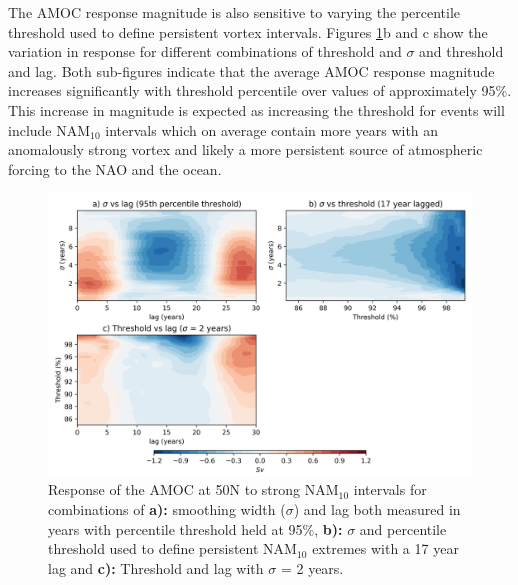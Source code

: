 The AMOC response magnitude is also sensitive to varying the percentile threshold used to define persistent vortex intervals. Figures \ref{sensitivity}b and c show the variation in response for different combinations of threshold and $\sigma$ and threshold and lag. Both sub-figures indicate that the average AMOC response magnitude increases significantly with threshold percentile over values of approximately 95\%. This increase in magnitude is expected as increasing the threshold for events will include NAM$_{10}$ intervals which on average contain more years with an anomalously strong vortex and likely a more persistent source of atmospheric forcing to the NAO and the ocean. 

\begin{figure}[h!]
\begin{center}
\noindent\includegraphics[width =\linewidth]{Figures/Figures-surface/sensitivity_contours_strong.png} 
\caption[Response of the AMOC at 50N to strong NAM$_{10}$ intervals for combinations of $\sigma$, threshold and lag]{Response of the AMOC at 50N to strong NAM$_{10}$ intervals for combinations of \textbf{a):} smoothing width ($\sigma$) and lag both measured in years with percentile threshold held at 95\%, \textbf{b):} $\sigma$ and percentile threshold used to define persistent NAM$_{10}$ extremes with a 17 year lag and \textbf{c):} Threshold and lag with $\sigma$ = 2 years.}
\label{sensitivity}
\end{center}
\end{figure}

